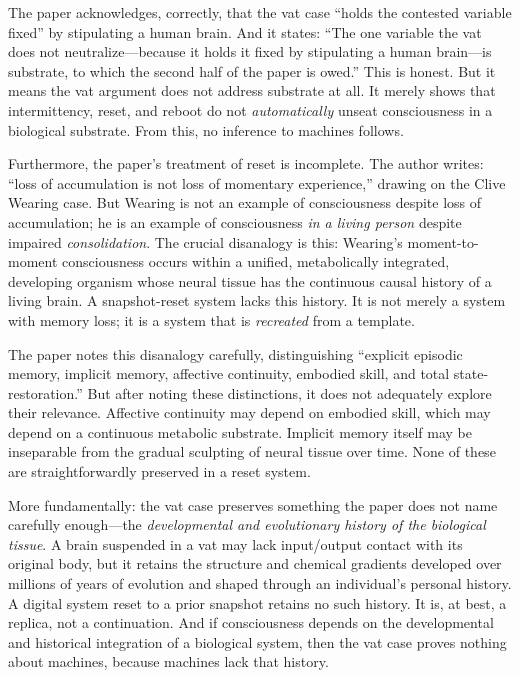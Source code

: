 \documentclass[11pt]{article}
\begin{document}
The paper acknowledges, correctly, that the vat case ``holds the contested variable fixed'' by stipulating a human brain. And it states: ``The one variable the vat does not neutralize---because it holds it fixed by stipulating a human brain---is substrate, to which the second half of the paper is owed.'' This is honest. But it means the vat argument does not address substrate at all. It merely shows that intermittency, reset, and reboot do not \textit{automatically} unseat consciousness in a biological substrate. From this, no inference to machines follows.

Furthermore, the paper's treatment of reset is incomplete. The author writes: ``loss of accumulation is not loss of momentary experience,'' drawing on the Clive Wearing case. But Wearing is not an example of consciousness despite loss of accumulation; he is an example of consciousness \textit{in a living person} despite impaired \textit{consolidation}. The crucial disanalogy is this: Wearing's moment-to-moment consciousness occurs within a unified, metabolically integrated, developing organism whose neural tissue has the continuous causal history of a living brain. A snapshot-reset system lacks this history. It is not merely a system with memory loss; it is a system that is \textit{recreated} from a template.

The paper notes this disanalogy carefully, distinguishing ``explicit episodic memory, implicit memory, affective continuity, embodied skill, and total state-restoration.'' But after noting these distinctions, it does not adequately explore their relevance. Affective continuity may depend on embodied skill, which may depend on a continuous metabolic substrate. Implicit memory itself may be inseparable from the gradual sculpting of neural tissue over time. None of these are straightforwardly preserved in a reset system.

More fundamentally: the vat case preserves something the paper does not name carefully enough---the \textit{developmental and evolutionary history of the biological tissue}. A brain suspended in a vat may lack input/output contact with its original body, but it retains the structure and chemical gradients developed over millions of years of evolution and shaped through an individual's personal history. A digital system reset to a prior snapshot retains no such history. It is, at best, a replica, not a continuation. And if consciousness depends on the developmental and historical integration of a biological system, then the vat case proves nothing about machines, because machines lack that history.
\end{document}
